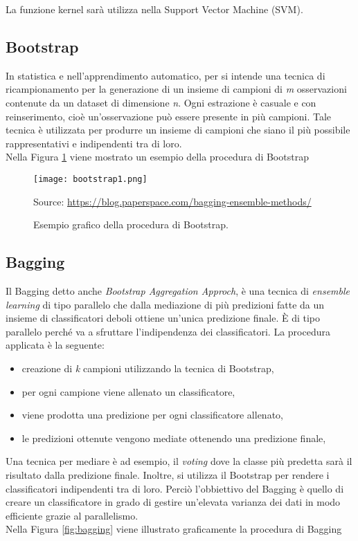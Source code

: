 La funzione kernel sarà utilizza nella Support Vector Machine (SVM).

\subsection{Bootstrap}
In statistica e nell'apprendimento automatico, per \textit{\cite{bootstrap}} si intende una tecnica di ricampionamento per la generazione di un insieme di campioni di \emph{m} osservazioni contenute da un dataset di dimensione \emph{n}. Ogni estrazione è casuale e con reinserimento, cioè un’osservazione può essere presente in più campioni. Tale tecnica è utilizzata per produrre un insieme di campioni che siano il più possibile rappresentativi e indipendenti tra di loro.\\
Nella Figura \ref{fig:bootstrap} viene mostrato un esempio della procedura di Bootstrap

\begin{figure}[h]
	\begin{center}
		\texttt{[image: bootstrap1.png]}
		\caption{Esempio grafico della procedura di Bootstrap.
		} 
		Source: \url{https://blog.paperspace.com/bagging-ensemble-methods/}\label{fig:bootstrap}
	\end{center}
\end{figure}

\subsection{Bagging}
Il Bagging \autocite{breiman1996bagging} detto anche \emph{Bootstrap Aggregation Approch}, è una tecnica di \emph{ensemble learning} di tipo parallelo che dalla mediazione di più predizioni fatte da un insieme di classificatori deboli ottiene un'unica predizione finale. È di tipo parallelo perché va a sfruttare l'indipendenza dei classificatori. La procedura applicata è la seguente:
\begin{itemize}
	\item creazione di \emph{k} campioni utilizzando la tecnica di Bootstrap,
	\item per ogni campione viene allenato un classificatore,
	\item viene prodotta una predizione per ogni classificatore allenato,
	\item le predizioni ottenute vengono mediate ottenendo una predizione finale,
\end{itemize} 
Una tecnica per mediare è ad esempio, il \emph{voting} dove la classe più predetta sarà il risultato dalla predizione finale. Inoltre, si utilizza il Bootstrap per rendere i classificatori indipendenti tra di loro.
Perciò l'obbiettivo del Bagging è quello di creare un classificatore in grado di gestire un'elevata varianza dei dati in modo efficiente grazie al parallelismo.\\
Nella Figura \ref{fig:bagging} viene illustrato graficamente la procedura di Bagging

